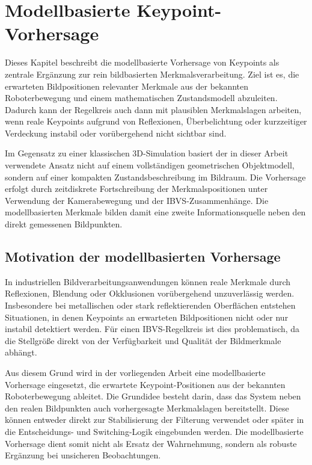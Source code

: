 \chapter{Modellbasierte Keypoint-Vorhersage}
\label{chap:modellbasierte_keypoint_vorhersage}

Dieses Kapitel beschreibt die modellbasierte Vorhersage von Keypoints als zentrale Ergänzung zur rein bildbasierten Merkmalsverarbeitung. Ziel ist es, die erwarteten Bildpositionen relevanter Merkmale aus der bekannten Roboterbewegung und einem mathematischen Zustandsmodell abzuleiten. Dadurch kann der Regelkreis auch dann mit plausiblen Merkmalslagen arbeiten, wenn reale Keypoints aufgrund von Reflexionen, Überbelichtung oder kurzzeitiger Verdeckung instabil oder vorübergehend nicht sichtbar sind.

Im Gegensatz zu einer klassischen 3D-Simulation basiert der in dieser Arbeit verwendete Ansatz nicht auf einem vollständigen geometrischen Objektmodell, sondern auf einer kompakten Zustandsbeschreibung im Bildraum. Die Vorhersage erfolgt durch zeitdiskrete Fortschreibung der Merkmalspositionen unter Verwendung der Kamerabewegung und der \ac{IBVS}-Zusammenhänge. Die modellbasierten Merkmale bilden damit eine zweite Informationsquelle neben den direkt gemessenen Bildpunkten.

\section{Motivation der modellbasierten Vorhersage}
\label{sec:motivation_modellbasierte_vorhersage}

In industriellen Bildverarbeitungsanwendungen können reale Merkmale durch Reflexionen, Blendung oder Okklusionen vorübergehend unzuverlässig werden. Insbesondere bei metallischen oder stark reflektierenden Oberflächen entstehen Situationen, in denen Keypoints an erwarteten Bildpositionen nicht oder nur instabil detektiert werden. Für einen \ac{IBVS}-Regelkreis ist dies problematisch, da die Stellgröße direkt von der Verfügbarkeit und Qualität der Bildmerkmale abhängt.

Aus diesem Grund wird in der vorliegenden Arbeit eine modellbasierte Vorhersage eingesetzt, die erwartete Keypoint-Positionen aus der bekannten Roboterbewegung ableitet. Die Grundidee besteht darin, dass das System neben den realen Bildpunkten auch vorhergesagte Merkmalslagen bereitstellt. Diese können entweder direkt zur Stabilisierung der Filterung verwendet oder später in die Entscheidungs- und Switching-Logik eingebunden werden. Die modellbasierte Vorhersage dient somit nicht als Ersatz der Wahrnehmung, sondern als robuste Ergänzung bei unsicheren Beobachtungen.


